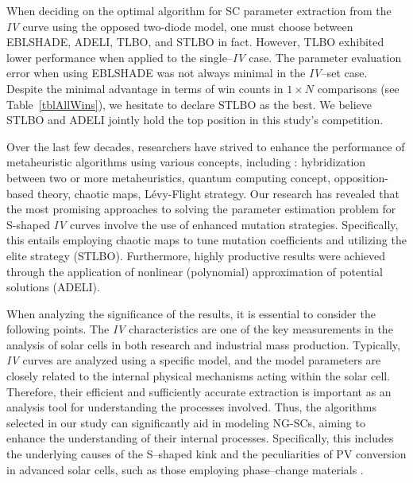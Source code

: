 \documentclass[a4paper,fleqn]{cas-sc}
\begin{document}
When deciding on the optimal algorithm for SC parameter extraction from
the \emph{IV} curve using the opposed two-diode model,
one must choose between EBLSHADE, ADELI, TLBO, and STLBO in fact.
However, TLBO exhibited lower performance when applied to the single--\emph{IV} case.
The parameter evaluation error when using EBLSHADE was not always minimal in the \emph{IV}--set case.
Despite the minimal advantage in terms of win counts in $1\times N$ comparisons
(see Table~\ref{tblAllWins}),
we hesitate to declare STLBO as the best.
We believe STLBO and ADELI jointly hold the top position in this study's competition.


Over the last few decades, researchers have strived to enhance the performance of metaheuristic algorithms using various concepts, including \cite{Kepler}:
hybridization between two or more metaheuristics, quantum computing concept, opposition-based theory, chaotic maps,  L\'{e}vy-Flight strategy.
Our research has revealed that the most promising approaches to solving
the parameter estimation problem for S-shaped \emph{IV} curves involve the use of enhanced mutation strategies.
Specifically, this entails employing chaotic maps to tune mutation coefficients and utilizing the elite strategy (STLBO).
Furthermore, highly productive results were achieved through the application of nonlinear (polynomial) approximation of potential solutions (ADELI).

When analyzing the significance of the results, it is essential to consider the following points.
The \emph{IV} characteristics are one of the key measurements  in the analysis
of solar cells in both research and industrial mass production.
Typically, \emph{IV} curves are analyzed using a specific model,
and the model parameters are closely related to the internal physical mechanisms acting within the solar cell.
Therefore, their efficient and sufficiently accurate extraction is important
as an analysis tool for understanding the processes involved.
Thus, the algorithms selected in our study can significantly aid in modeling NG-SCs,
aiming to enhance the understanding of their internal processes.
Specifically, this includes the underlying causes of the S--shaped kink
and the peculiarities of PV conversion in advanced solar cells, such as those employing phase--change materials \cite{Zhu2024,Zhu2023}.
\end{document}
